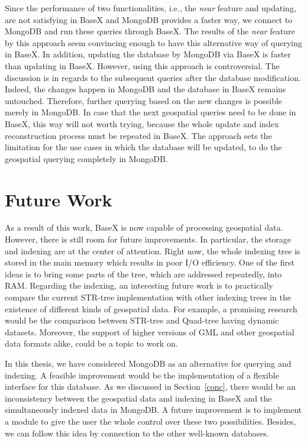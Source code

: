 \documentclass[a4paper,12pt]{article}
\begin{document}
Since the performance of two functionalities, i.e., the \textit{near} feature and updating, are not satisfying in BaseX and MongoDB provides a faster way, we connect to MongoDB and run these queries through BaseX. The results of the \textit{near} feature by this approach seem convincing enough to have this alternative way of querying in BaseX. In addition, updating the database by MongoDB via BaseX is faster than updating in BaseX. However, using this approach is controversial. The discussion is in regards to the subsequent queries after the database modification. Indeed, the changes happen in MongoDB and the database in BaseX remains untouched. Therefore, further querying based on the new changes is possible merely in MongoDB. In case that the next geospatial queries need to be done in BaseX, this way will not worth trying, because the whole update and index reconstruction process must be repeated in BaseX. The approach sets the limitation for the use cases in which the database will be updated, to do the geospatial querying completely in MongoDB.


\newpage
\section{Future Work}
\label{s.future}
As a result of this work, BaseX is now capable of processing geospatial data.
However, there is still room for future improvements. 
In particular, the storage and indexing are at the center of attention.
Right now, the whole indexing tree is stored in the main memory 
which results in poor I/O efficiency. %
One of the first ideas is to bring some parts of the tree, 
which are addressed repeatedly, into RAM.
Regarding the indexing, an interesting future work is to practically compare 
the current STR-tree implementation with other indexing trees in the existence of
different kinds of geospatial data. For example, a promising research would be
the comparison between STR-tree and Quad-tree having dynamic datasets.
Moreover, the support of higher versions of GML and other geospatial data 
formats alike, could be a topic to work on.

In this thesis, we have considered MongoDB as an alternative for querying and indexing.
A feasible improvement would be the implementation of a flexible interface
for this database. As we discussed in Section~\ref{conc}, 
there would be an inconsistency between 
the geospatial data and indexing in BaseX and
the simultaneously indexed data in MongoDB. A future improvement is to 
implement a module to give the user the whole control over these two possibilities.
Besides, we can follow this idea by connection to the other well-known databases.
\end{document}
